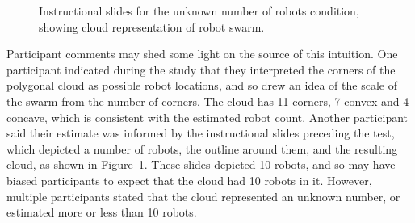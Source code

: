 \begin{figure}
	\centering
	\begin{subfigure}{\textwidth}
	\end{subfigure}
	\caption{Instructional slides for the unknown number of robots condition, showing cloud representation of robot swarm.}
	\label{instructional_slides}
\end{figure}

Participant comments may shed some light on the source of this intuition. 
One participant indicated during the study that they interpreted the corners of the polygonal cloud as possible robot locations, and so drew an idea of the scale of the swarm from the number of corners. 
The cloud has 11 corners, 7 convex and 4 concave, which is consistent with the estimated robot count. 
Another participant said their estimate was informed by the instructional slides preceding the test, which depicted a number of robots, the outline around them, and the resulting cloud, as shown in Figure~\ref{instructional_slides}. 
These slides depicted 10 robots, and so may have biased participants to expect that the cloud had 10 robots in it. 
However, multiple participants stated that the cloud represented an unknown number, or estimated more or less than 10 robots.

